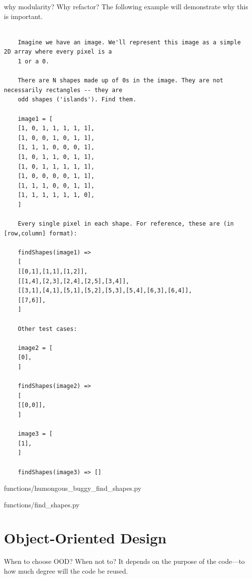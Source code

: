\documentclass[oneside,11pt]{book}
\theoremstyle{definition}
\theoremstyle{remark}
\begin{document}
why modularity?
Why refactor?
The following example will demonstrate why this is important.
\begin{verbatim}

    Imagine we have an image. We'll represent this image as a simple 2D array where every pixel is a
    1 or a 0.

    There are N shapes made up of 0s in the image. They are not necessarily rectangles -- they are
    odd shapes ('islands'). Find them.

    image1 = [
    [1, 0, 1, 1, 1, 1, 1],
    [1, 0, 0, 1, 0, 1, 1],
    [1, 1, 1, 0, 0, 0, 1],
    [1, 0, 1, 1, 0, 1, 1],
    [1, 0, 1, 1, 1, 1, 1],
    [1, 0, 0, 0, 0, 1, 1],
    [1, 1, 1, 0, 0, 1, 1],
    [1, 1, 1, 1, 1, 1, 0],
    ]

    Every single pixel in each shape. For reference, these are (in [row,column] format):

    findShapes(image1) =>
    [
    [[0,1],[1,1],[1,2]],
    [[1,4],[2,3],[2,4],[2,5],[3,4]],
    [[3,1],[4,1],[5,1],[5,2],[5,3],[5,4],[6,3],[6,4]],
    [[7,6]],
    ]

    Other test cases:

    image2 = [
    [0],
    ]

    findShapes(image2) =>
    [
    [[0,0]],
    ]

    image3 = [
    [1],
    ]

    findShapes(image3) => []
\end{verbatim}

\begin{clisting}
    
    {functions/humongous_buggy_find_shapes.py}
    
    {functions/find_shapes.py}
    \caption{Find connected shapes problem.}
\end{clisting}
\clearpage{}
    \clearpage{}

\chapter{Object-Oriented Design} \label{ch:ood}

When to choose OOD?
When not to?
It depends on the purpose of the code---to how much degree will the code be reused.
\end{document}
